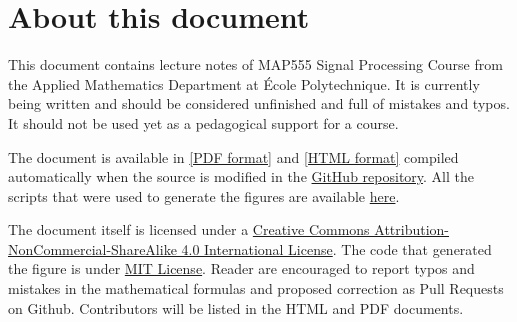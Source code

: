 \section{About this document}

This document contains lecture notes of MAP555 Signal Processing
Course from the Applied Mathematics Department at École Polytechnique. It is
currently being written and should be considered
unfinished and full of mistakes and typos. It should not be used yet as a
pedagogical support for a course. 

The document is available in \href{https://rflamary.github.io/map555-signal-processing/poly.pdf}{[PDF
format]} and \href{https://rflamary.github.io/map555-signal-processing/}{[HTML
format]} compiled automatically when the source is modified in the \href{https://rflamary.github.io/map555-signal-processing/}{GitHub
repository}. All the scripts that were used to generate the figures are
available \href{https://github.com/rflamary/map555-signal-processing/tree/main/scripts}{here}.

The document itself is licensed under a
\href{http://creativecommons.org/licenses/by-nc-sa/4.0/}{Creative Commons
Attribution-NonCommercial-ShareAlike 4.0 International License}. The code that
generated the figure is under \href{https://opensource.org/licenses/MIT}{MIT License}.
Reader are
encouraged to report typos and mistakes in the mathematical formulas and
proposed correction as Pull Requests on Github. Contributors will be listed in
the HTML and PDF documents.


